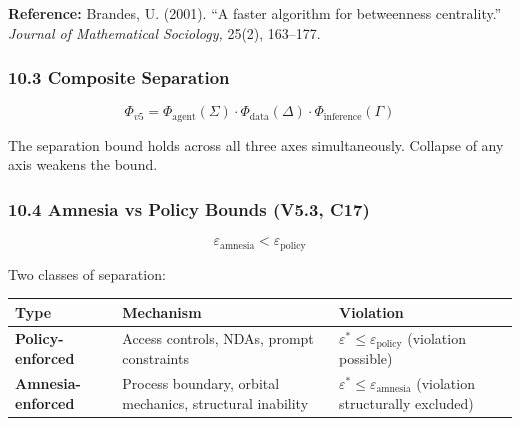 \documentclass[
]{article}
\newcounter{none} %
\begin{document}
\textbf{Reference:} Brandes, U. (2001). ``A faster algorithm for
betweenness centrality.'' \emph{Journal of Mathematical Sociology,}
25(2), 163--177.

\subsubsection{10.3 Composite Separation}\label{composite-separation}

\[\Phi_{v5} = \Phi_{\text{agent}}(\Sigma) \cdot \Phi_{\text{data}}(\Delta) \cdot \Phi_{\text{inference}}(\Gamma)\]

The separation bound holds across all three axes simultaneously.
Collapse of any axis weakens the bound.

\subsubsection{10.4 Amnesia vs Policy Bounds (V5.3,
C17)}\label{amnesia-vs-policy-bounds-v5.3-c17}

\[\varepsilon_{\text{amnesia}} < \varepsilon_{\text{policy}}\]

Two classes of separation:

{\def\LTcaptype{none} %
\begin{longtable}[]{@{}
  >{\raggedright\arraybackslash}p{}
  >{\raggedright\arraybackslash}p{}
  >{\raggedright\arraybackslash}p{}@{}}
\toprule\noalign{}
\begin{minipage}[b]{\linewidth}\raggedright
Type
\end{minipage} & \begin{minipage}[b]{\linewidth}\raggedright
Mechanism
\end{minipage} & \begin{minipage}[b]{\linewidth}\raggedright
Violation
\end{minipage} \\
\midrule\noalign{}
\endhead
\bottomrule\noalign{}
\endlastfoot
\textbf{Policy-enforced} & Access controls, NDAs, prompt constraints &
\(\varepsilon^* \leq \varepsilon_{\text{policy}}\) (violation
possible) \\
\textbf{Amnesia-enforced} & Process boundary, orbital mechanics,
structural inability &
\(\varepsilon^* \leq \varepsilon_{\text{amnesia}}\) (violation
structurally excluded) \\
\end{longtable}
}
\end{document}
